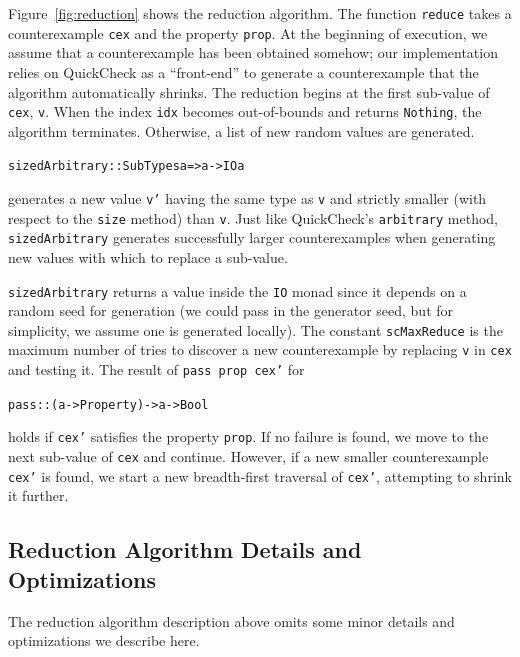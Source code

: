 \documentclass[10pt]{sigplanconf}
\newenvironment{code}{\begin{alltt}}{\end{alltt}}
\newcommand{\ttp}[1]{\texttt{#1}}
\begin{document}
Figure~\ref{fig:reduction} shows the reduction algorithm.  The function
\ttp{reduce} takes a counterexample \ttp{cex} and the property \ttp{prop}.  At
the beginning of execution, we assume that a counterexample has been obtained
somehow; our implementation relies on QuickCheck as a ``front-end'' to generate
a counterexample that the algorithm automatically shrinks.  The reduction begins
at the first sub-value of \ttp{cex}, \ttp{v}.  When the index \ttp{idx} becomes
out-of-bounds and returns \ttp{Nothing}, the algorithm terminates.  Otherwise, a
list of new random values are generated.
%
\begin{code}
sizedArbitrary :: SubTypes a => a -> IO a
\end{code}
%
\noindent
generates a new value \ttp{v'} having the same type as \ttp{v} and strictly
smaller (with respect to the \ttp{size} method) than \ttp{v}.  Just like
QuickCheck's \ttp{arbitrary} method, \ttp{sizedArbitrary} generates successfully
larger counterexamples when generating new values with which to replace a
sub-value.


\ttp{sizedArbitrary} returns a value inside the \ttp{IO} monad since it depends
on a random seed for generation (we could pass in the generator seed, but for
simplicity, we assume one is generated locally).  The constant \ttp{scMaxReduce} is
the maximum number of tries to discover a new counterexample by replacing
\ttp{v} in \ttp{cex} and testing it.  The result of \ttp{pass prop cex'} for
%
\begin{code}
pass :: (a -> Property) -> a -> Bool
\end{code}
%
\noindent
holds if \ttp{cex'} satisfies the property \ttp{prop}.  If no failure is found,
we move to the next sub-value of \ttp{cex} and continue.  However, if a new
smaller counterexample \ttp{cex'} is found, we start a new breadth-first
traversal of \ttp{cex'}, attempting to shrink it further.

\subsection{Reduction Algorithm Details and Optimizations}
The reduction algorithm description above omits some minor details and
optimizations we describe here.
\end{document}
